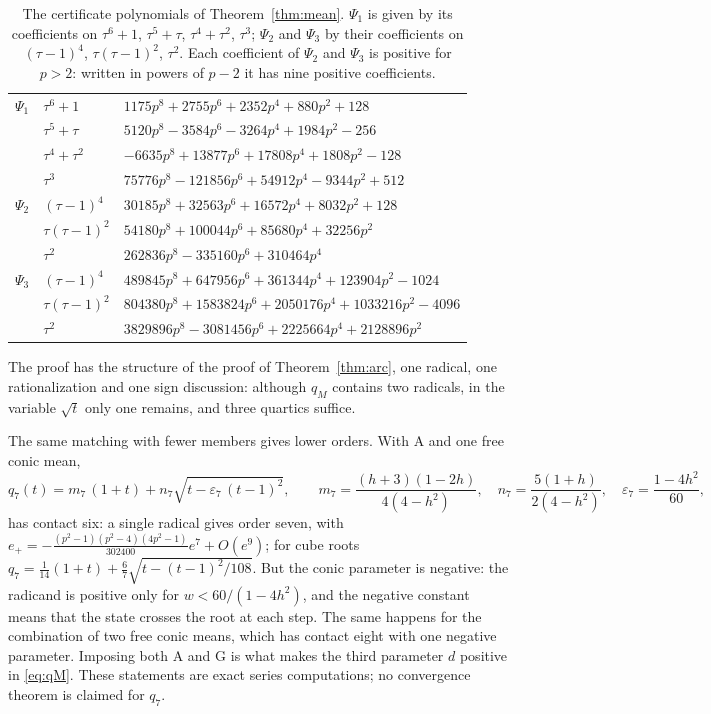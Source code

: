 \begin{table}[h]
\centering\small
\caption{The certificate polynomials of Theorem~\ref{thm:mean}. $\Psi_1$ is given by its coefficients on
$\tau^{6}+1$, $\tau^{5}+\tau$, $\tau^{4}+\tau^{2}$, $\tau^{3}$; $\Psi_2$ and $\Psi_3$ by their
coefficients on $(\tau-1)^{4}$, $\tau(\tau-1)^{2}$, $\tau^{2}$. Each coefficient of $\Psi_2$ and
$\Psi_3$ is positive for $p>2$: written in powers of $p-2$ it has nine positive
coefficients.}\label{tab:mean-cert}
\begin{tabular}{@{}lll@{}}
\toprule
$\Psi_1$ & $\tau^{6}+1$ & $1175p^{8}+2755p^{6}+2352p^{4}+880p^{2}+128$\\
 & $\tau^{5}+\tau$ & $5120p^{8}-3584p^{6}-3264p^{4}+1984p^{2}-256$\\
 & $\tau^{4}+\tau^{2}$ & $-6635p^{8}+13877p^{6}+17808p^{4}+1808p^{2}-128$\\
 & $\tau^{3}$ & $75776p^{8}-121856p^{6}+54912p^{4}-9344p^{2}+512$\\
\midrule
$\Psi_2$ & $(\tau-1)^{4}$ & $30185p^{8}+32563p^{6}+16572p^{4}+8032p^{2}+128$\\
 & $\tau(\tau-1)^{2}$ & $54180p^{8}+100044p^{6}+85680p^{4}+32256p^{2}$\\
 & $\tau^{2}$ & $262836p^{8}-335160p^{6}+310464p^{4}$\\
\midrule
$\Psi_3$ & $(\tau-1)^{4}$ & $489845p^{8}+647956p^{6}+361344p^{4}+123904p^{2}-1024$\\
 & $\tau(\tau-1)^{2}$ & $804380p^{8}+1583824p^{6}+2050176p^{4}+1033216p^{2}-4096$\\
 & $\tau^{2}$ & $3829896p^{8}-3081456p^{6}+2225664p^{4}+2128896p^{2}$\\
\bottomrule
\end{tabular}
\end{table}

The proof has the structure of the proof of Theorem~\ref{thm:arc}, one radical, one rationalization
and one sign discussion: although $q_M$ contains two radicals, in the variable $\sqrt t$ only one
remains, and three quartics suffice.

\begin{remark}\label{rem:family}
The same matching with fewer members gives lower orders. With $\mathrm A$ and one free conic mean,
\[ q_7(t)=m_7\,(1+t)+n_7\sqrt{t-\varepsilon_7\,(t-1)^{2}},\qquad
m_7=\frac{(h+3)(1-2h)}{4(4-h^{2})},\quad n_7=\frac{5(1+h)}{2(4-h^{2})},\quad
\varepsilon_7=\frac{1-4h^{2}}{60}, \]
has contact six: a single radical gives order seven, with
$e_+=-\tfrac{(p^{2}-1)(p^{2}-4)(4p^{2}-1)}{302400}e^{7}+O(e^{9})$; for cube roots
$q_7=\tfrac1{14}(1+t)+\tfrac67\sqrt{t-(t-1)^{2}/108}$. But the conic parameter is negative: the radicand
is positive only for $w<60/(1-4h^{2})$, and the negative constant means that the state crosses the root
at each step. The same happens for the combination of two free conic means, which has contact eight
with one negative parameter. Imposing both $\mathrm A$ and $\mathrm G$ is what makes the third
parameter $d$ positive in \eqref{eq:qM}. These statements are exact series computations; no
convergence theorem is claimed for $q_7$.
\end{remark}
